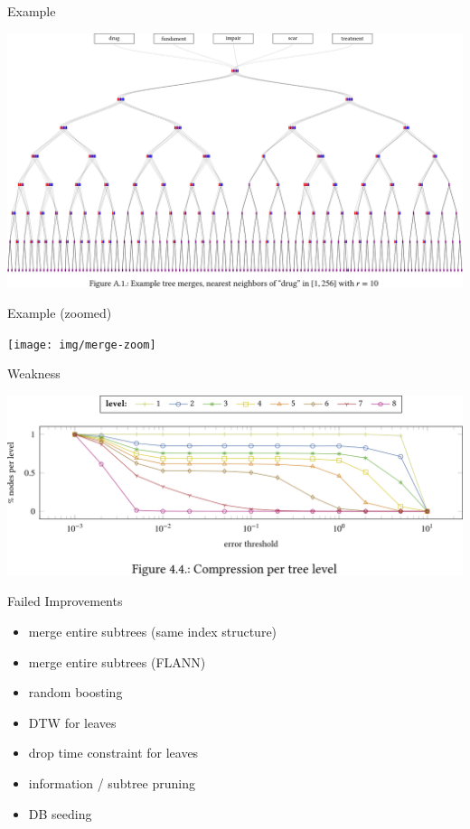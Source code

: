 \documentclass[14pt,t]{beamer}
\begin{document}
\begin{frame}[c]{Example}
    \begin{center}
        \includegraphics[width = \textwidth]{img/merge}
    \end{center}
\end{frame}
\begin{frame}[c]{Example (zoomed)}
    \begin{center}
        \texttt{[image: img/merge-zoom]}
    \end{center}
\end{frame}
\begin{frame}[c]{Weakness}
    \begin{center}
        \includegraphics[width = \textwidth]{img/weakness}
    \end{center}
\end{frame}
\begin{frame}{Failed Improvements}
    \begin{itemize}
        \item merge entire subtrees (same index structure)
        \item merge entire subtrees (FLANN)
        \item random boosting
        \item DTW for leaves
        \item drop time constraint for leaves
        \item information / subtree pruning
        \item DB seeding
    \end{itemize}
\end{frame}
\end{document}
